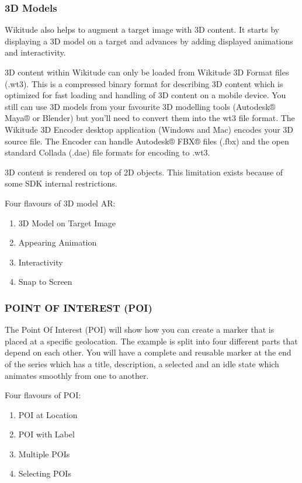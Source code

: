 \documentclass{article}
\begin{document}
\subsubsection{3D Models}
\par Wikitude also helps to augment a target image with 3D content. It starts by displaying a 3D model on a target and advances by adding displayed animations and interactivity.
\par 3D content within Wikitude can only be loaded from Wikitude 3D Format files (.wt3). This is a compressed binary format for describing 3D content which is optimized for fast loading and handling of 3D content on a mobile device. You still can use 3D models from your favourite 3D modelling tools (Autodesk® Maya® or Blender) but you'll need to convert them into the wt3 file format. The Wikitude 3D Encoder desktop application (Windows and Mac) encodes your 3D source file. The Encoder can handle Autodesk® FBX® files (.fbx) and the open standard Collada (.dae) file formats for encoding to .wt3. 
\par 3D content is rendered on top of 2D objects. This limitation exists because of some SDK internal restrictions. 
\par Four flavours of 3D model AR: 
\begin{enumerate}
\item  3D Model on Target Image
\item Appearing Animation 
\item Interactivity
\item Snap to Screen 
\end{enumerate}

\subsubsection{POINT OF INTEREST (POI) }
\par The Point Of Interest (POI) will show how you can create a marker that is placed at a specific geolocation. The example is split into four different parts that depend on each other. You will have a complete and reusable marker at the end of the series which has a title, description, a selected and an idle state which animates smoothly from one to another. 
\par Four flavours of POI:
\begin{enumerate}
\item POI at Location 
\item POI with Label 
\item Multiple POIs 
\item Selecting POIs
\end{enumerate}
\end{document}
